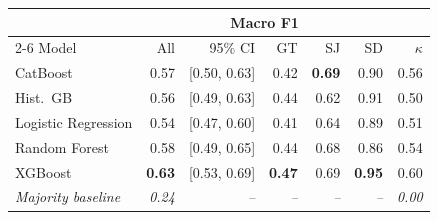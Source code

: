 \begin{tabular}{lrrrrrr}
\toprule
 & \multicolumn{5}{c}{Macro F1} & \\
\cmidrule(lr){2-6}
Model & All & 95\% CI & GT & SJ & SD & $\kappa$ \\
\midrule
CatBoost & 0.57 & [0.50, 0.63] & 0.42 & \textbf{0.69} & 0.90 & 0.56 \\
Hist.\ GB & 0.56 & [0.49, 0.63] & 0.44 & 0.62 & 0.91 & 0.50 \\
Logistic Regression & 0.54 & [0.47, 0.60] & 0.41 & 0.64 & 0.89 & 0.51 \\
Random Forest & 0.58 & [0.49, 0.65] & 0.44 & 0.68 & 0.86 & 0.54 \\
XGBoost & \textbf{0.63} & [0.53, 0.69] & \textbf{0.47} & 0.69 & \textbf{0.95} & 0.60 \\
\emph{Majority baseline} & \emph{0.24} & \emph{--} & \emph{--} & \emph{--} & \emph{--} & \emph{0.00} \\
\bottomrule
\end{tabular}
